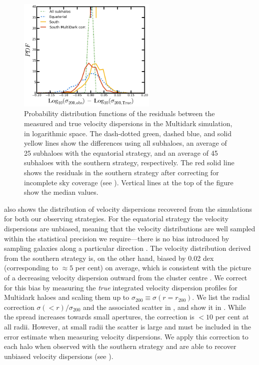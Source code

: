 \begin{figure}
 \centerline{\includegraphics[width=2.6in]{chapter3/Histo_veldisp_COMP.png}}
\caption{Probability distribution functions of the residuals between the measured and true 
velocity dispersions in the Multidark simulation, in logarithmic space. The dash-dotted green, 
dashed blue, and solid yellow lines show the differences using all subhaloes, an average of 25 
subhaloes with the equatorial strategy, and an average of 45 subhaloes with the southern strategy, 
respectively. The red solid line shows the residuals in the southern strategy after correcting for 
incomplete sky coverage (see ). Vertical lines at the top of the figure show the 
median values.}
\label{f:veldisp_sims}
\end{figure}

 also shows the distribution of velocity dispersions recovered from the simulations for both our observing strategies. For the equatorial strategy the velocity dispersions are unbiased, meaning that the velocity distributions are well sampled within the statistical precision we require---there is no bias introduced by sampling galaxies along a particular direction \cite[but see][ for evidence of a preferred direction for the velocity distribution in galaxy clusters]{skielboe12}. The velocity distribution derived from the southern strategy is, on the other hand, biased by 0.02 dex (corresponding to $\approx5$ per cent) on average, which is consistent with the picture of a decreasing velocity dispersion outward from the cluster centre \citep[e.g.,][]{mamon10}. We correct for this bias by measuring the \textit{true} integrated velocity dispersion profiles for Multidark haloes and scaling them up to $\sigma_{200} \equiv \sigma(r=r_{200})$. We list the radial correction $\sigma(<r)/\sigma_{200}$ and the associated scatter in , and show it in . While the spread increases towards small apertures, the correction is $<10$ per cent at all radii. However, at small radii the scatter is large and must be included in the error estimate when measuring velocity dispersions. We apply this correction to each halo when observed with the southern strategy and are able to recover unbiased velocity dispersions (see ).

